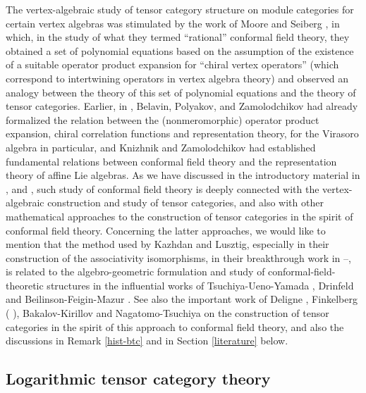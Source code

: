 \documentclass[12pt]{article}
\begin{document}
The vertex-algebraic study of tensor category structure on module
categories for certain vertex algebras was stimulated by the work of
Moore and Seiberg \cite{MS1} \cite{MS}, in which, in the study of what they
termed ``rational'' conformal field theory, they obtained a set of polynomial 
equations  based on the assumption of the existence of a
suitable operator product expansion for ``chiral vertex operators''
(which correspond to intertwining operators in vertex algebra theory)
and observed an analogy between the theory of this set of polynomial equations
and the theory of tensor
categories.
Earlier, in \cite{BPZ}, Belavin, Polyakov, and Zamolodchikov had
already formalized the relation between the (nonmeromorphic) operator
product expansion, chiral correlation functions and representation
theory, for the Virasoro algebra in particular, and Knizhnik and
Zamolodchikov \cite{KZ} had established fundamental relations between
conformal field theory and the representation theory of affine Lie
algebras.  As we have discussed in the introductory material in
\cite{tensorK}, \cite{tensor1} and \cite{HLaffine}, such study of
conformal field theory is deeply connected with the vertex-algebraic
construction and study of tensor categories, and also with other
mathematical approaches to the construction of tensor categories in
the spirit of conformal field theory.  Concerning the latter
approaches, we would like to mention that the method used by Kazhdan
and Lusztig, especially in their construction of the associativity
isomorphisms, in their breakthrough work in \cite{KL1}--\cite{KL5}, is
related to the algebro-geometric formulation and study of
conformal-field-theoretic structures in the influential works of
Tsuchiya-Ueno-Yamada \cite{TUY}, Drinfeld \cite{Dr} and
Beilinson-Feigin-Mazur \cite{BFM}.  See also the important work of
Deligne \cite{De}, Finkelberg (\cite{F1} \cite{F2}), Bakalov-Kirillov
\cite{BK} and Nagatomo-Tsuchiya \cite{NT} on the construction of
tensor categories in the spirit of this approach to conformal field
theory, and also the discussions in Remark \ref{hist-btc} and in Section 
\ref{literature} below.

\subsection{Logarithmic tensor category theory}
\end{document}
